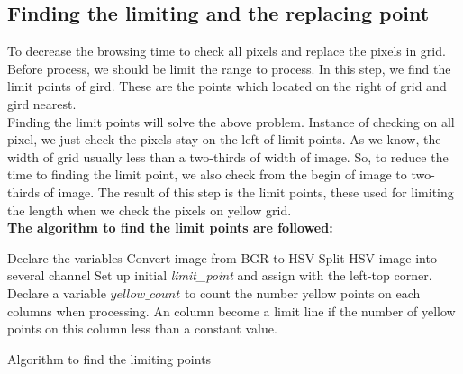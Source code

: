 \subsection{Finding the limiting and the replacing point}
To decrease the browsing time to check all pixels and replace the pixels in grid. Before process, we should be limit the range to process. In this step, we find the limit points of gird. These are the points which located on the right of grid and gird nearest.\\
Finding the limit points will solve the above problem. Instance of checking on all pixel, we just check the pixels stay on the left of limit points. As we know, the width of grid usually less than a two-thirds of width of image. So, to reduce the time to finding the limit point, we also check from the begin of image to two-thirds of image. The result of this step is the limit points, these used for limiting the length when we check the pixels on yellow grid.\\
\textbf{The algorithm to find the limit points are followed:}\\
\begin{algorithm}[H]
\Indm
{}
\Indp
Declare the variables\;
Convert image from BGR to HSV\;
Split HSV image into several channel
Set up initial \textit{limit\_point} and assign with the left-top corner.\;
Declare a variable $yellow\_count$ to count the number yellow points on each columns when processing. An column become a limit line if the number of yellow points on this column less than a constant value.\;
\caption{Algorithm to find the limiting points}
\end{algorithm}
